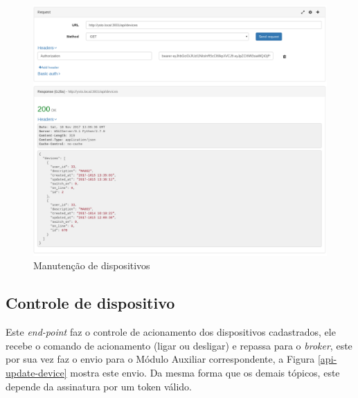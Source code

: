 \begin{figure}[H]
\caption{\label{api-devices} Manutenção de dispositivos}
\includegraphics[scale=0.30]{img/08-api-devices.png}
\end{figure}

\subsection{Controle de dispositivo}
Este \textit{end-point} faz o controle de acionamento dos dispositivos cadastrados, ele recebe o comando de acionamento (ligar ou desligar) e repassa para o \textit{broker}, este por sua vez faz o envio para o Módulo Auxiliar correspondente, a Figura \ref{api-update-device} mostra este envio. Da mesma forma que os demais tópicos, este depende da assinatura por um token válido.


